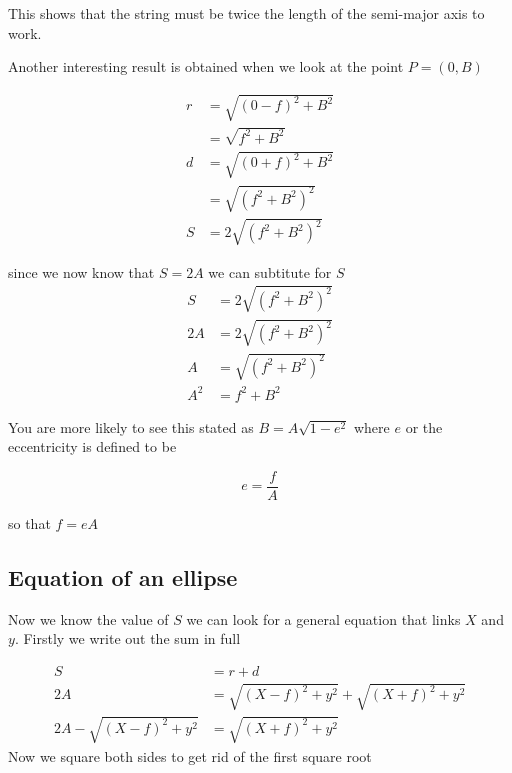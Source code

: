 This shows that the string must be twice the length of the semi-major axis to work.

Another interesting result is obtained when we look at the point $P=(0,B)$

\begin{align}
r &=  \sqrt{(0-f)^2+B^2}\nonumber \\
&=  \sqrt{f^2+B^2}\nonumber \\
d &= \sqrt{(0+f)^2+B^2}\nonumber \\
&= \sqrt{(f^2+B^2)^2}\nonumber \\
S &=2  \sqrt{(f^2+B^2)^2}
\end{align}

since we now know that $S=2A$ we can subtitute for $S$
\begin{align}
S &=2  \sqrt{(f^2+B^2)^2} \nonumber \\
2A &=2  \sqrt{(f^2+B^2)^2} \nonumber \\
A &=\sqrt{(f^2+B^2)^2} \nonumber \\
A^2 &=f^2+B^2 \label{eq:geom1}
\end{align}

You are more likely to see this stated as $B=A\sqrt{1-e^2}$ where $e$ or the eccentricity is defined to be 

\begin{equation}
e=\frac{f}{A} \label{eq:geom-eccentricity}
\end{equation}

so that $f=eA$

\subsection{Equation of an ellipse}

Now we know the value of $S$ we can look for a general equation that links $X$ and $y$. Firstly we write out the sum in full

\begin{align}
S & = r + d \nonumber \\
2A &= \sqrt{(X-f)^2+y^2} +  \sqrt{(X+f)^2+y^2} \nonumber \\
2A -\sqrt{(X-f)^2+y^2}  &=\sqrt{(X+f)^2+y^2}
\end{align}
Now we square both sides to get rid of the first square root

